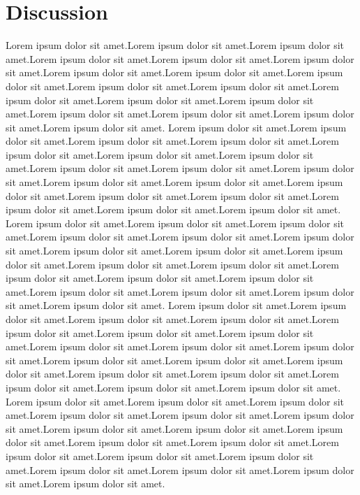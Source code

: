 \documentclass[main.tex]{subfiles}
\begin{document}
\chapter{Discussion}

Lorem ipsum dolor sit amet.Lorem ipsum dolor sit amet.Lorem ipsum dolor sit amet.Lorem ipsum dolor sit amet.Lorem ipsum dolor sit amet.Lorem ipsum dolor sit amet.Lorem ipsum dolor sit amet.Lorem ipsum dolor sit amet.Lorem ipsum dolor sit amet.Lorem ipsum dolor sit amet.Lorem ipsum dolor sit amet.Lorem ipsum dolor sit amet.Lorem ipsum dolor sit amet.Lorem ipsum dolor sit amet.Lorem ipsum dolor sit amet.Lorem ipsum dolor sit amet.Lorem ipsum dolor sit amet.Lorem ipsum dolor sit amet.
Lorem ipsum dolor sit amet.Lorem ipsum dolor sit amet.Lorem ipsum dolor sit amet.Lorem ipsum dolor sit amet.Lorem ipsum dolor sit amet.Lorem ipsum dolor sit amet.Lorem ipsum dolor sit amet.Lorem ipsum dolor sit amet.Lorem ipsum dolor sit amet.Lorem ipsum dolor sit amet.Lorem ipsum dolor sit amet.Lorem ipsum dolor sit amet.Lorem ipsum dolor sit amet.Lorem ipsum dolor sit amet.Lorem ipsum dolor sit amet.Lorem ipsum dolor sit amet.Lorem ipsum dolor sit amet.Lorem ipsum dolor sit amet.
Lorem ipsum dolor sit amet.Lorem ipsum dolor sit amet.Lorem ipsum dolor sit amet.Lorem ipsum dolor sit amet.Lorem ipsum dolor sit amet.Lorem ipsum dolor sit amet.Lorem ipsum dolor sit amet.Lorem ipsum dolor sit amet.Lorem ipsum dolor sit amet.Lorem ipsum dolor sit amet.Lorem ipsum dolor sit amet.Lorem ipsum dolor sit amet.Lorem ipsum dolor sit amet.Lorem ipsum dolor sit amet.Lorem ipsum dolor sit amet.Lorem ipsum dolor sit amet.Lorem ipsum dolor sit amet.Lorem ipsum dolor sit amet.
Lorem ipsum dolor sit amet.Lorem ipsum dolor sit amet.Lorem ipsum dolor sit amet.Lorem ipsum dolor sit amet.Lorem ipsum dolor sit amet.Lorem ipsum dolor sit amet.Lorem ipsum dolor sit amet.Lorem ipsum dolor sit amet.Lorem ipsum dolor sit amet.Lorem ipsum dolor sit amet.Lorem ipsum dolor sit amet.Lorem ipsum dolor sit amet.Lorem ipsum dolor sit amet.Lorem ipsum dolor sit amet.Lorem ipsum dolor sit amet.Lorem ipsum dolor sit amet.Lorem ipsum dolor sit amet.Lorem ipsum dolor sit amet.
Lorem ipsum dolor sit amet.Lorem ipsum dolor sit amet.Lorem ipsum dolor sit amet.Lorem ipsum dolor sit amet.Lorem ipsum dolor sit amet.Lorem ipsum dolor sit amet.Lorem ipsum dolor sit amet.Lorem ipsum dolor sit amet.Lorem ipsum dolor sit amet.Lorem ipsum dolor sit amet.Lorem ipsum dolor sit amet.Lorem ipsum dolor sit amet.Lorem ipsum dolor sit amet.Lorem ipsum dolor sit amet.Lorem ipsum dolor sit amet.Lorem ipsum dolor sit amet.Lorem ipsum dolor sit amet.Lorem ipsum dolor sit amet.
\end{document}

